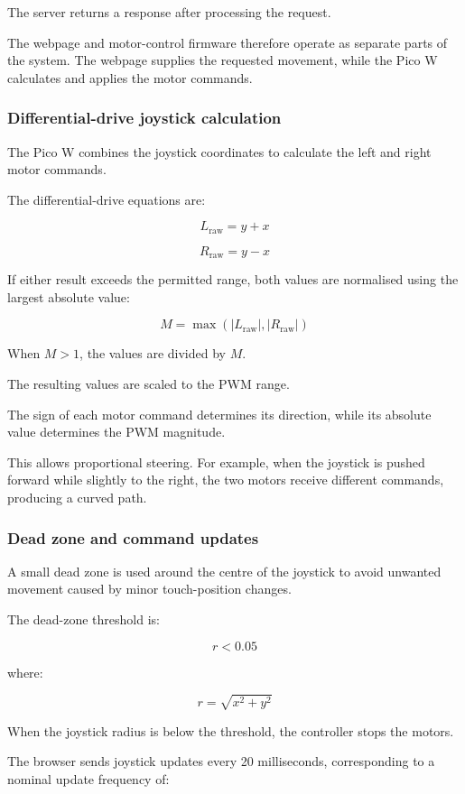 \documentclass[11pt,a4paper]{article}
\begin{document}
The server returns a response after processing
the request.

The webpage and motor-control firmware therefore
operate as separate parts of the system. The
webpage supplies the requested movement, while
the Pico W calculates and applies the motor commands.


\subsubsection{Differential-drive joystick calculation}

The Pico W combines the joystick coordinates to
calculate the left and right motor commands.

The differential-drive equations are:

\[
L_{\mathrm{raw}}=y+x
\]

\[
R_{\mathrm{raw}}=y-x
\]

If either result exceeds the permitted range,
both values are normalised using the largest
absolute value:

\[
M=\max\left(
|L_{\mathrm{raw}}|,
|R_{\mathrm{raw}}|
\right)
\]

When \(M>1\), the values are divided by \(M\).

The resulting values are scaled to the PWM range.

The sign of each motor command determines its
direction, while its absolute value determines
the PWM magnitude.

This allows proportional steering. For example,
when the joystick is pushed forward while slightly
to the right, the two motors receive different
commands, producing a curved path.


\subsubsection{Dead zone and command updates}

A small dead zone is used around the centre of
the joystick to avoid unwanted movement caused
by minor touch-position changes.

The dead-zone threshold is:

\[
r < 0.05
\]

where:

\[
r=\sqrt{x^2+y^2}
\]

When the joystick radius is below the threshold,
the controller stops the motors.

The browser sends joystick updates every
20 milliseconds, corresponding to a nominal
update frequency of:
\end{document}
